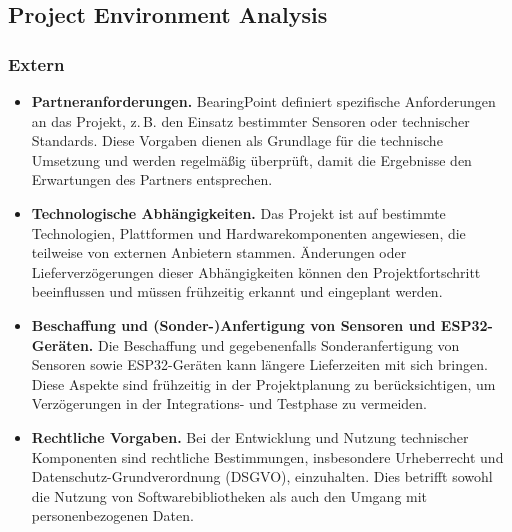 \documentclass{article}
\begin{document}
\subsection{Project Environment Analysis}

\subsubsection*{Extern}
\begin{itemize}
  \item \textbf{Partneranforderungen.} BearingPoint definiert spezifische Anforderungen an das Projekt, z.\,B. den Einsatz bestimmter Sensoren oder technischer Standards. Diese Vorgaben dienen als Grundlage für die technische Umsetzung und werden regelmäßig überprüft, damit die Ergebnisse den Erwartungen des Partners entsprechen.
  \item \textbf{Technologische Abhängigkeiten.} Das Projekt ist auf bestimmte Technologien, Plattformen und Hardwarekomponenten angewiesen, die teilweise von externen Anbietern stammen. Änderungen oder Lieferverzögerungen dieser Abhängigkeiten können den Projektfortschritt beeinflussen und müssen frühzeitig erkannt und eingeplant werden.
  \item \textbf{Beschaffung und (Sonder-)Anfertigung von Sensoren und ESP32-Geräten.} Die Beschaffung und gegebenenfalls Sonderanfertigung von Sensoren sowie ESP32-Geräten kann längere Lieferzeiten mit sich bringen. Diese Aspekte sind frühzeitig in der Projektplanung zu berücksichtigen, um Verzögerungen in der Integrations- und Testphase zu vermeiden.
  \item \textbf{Rechtliche Vorgaben.} Bei der Entwicklung und Nutzung technischer Komponenten sind rechtliche Bestimmungen, insbesondere Urheberrecht und Datenschutz-Grundverordnung (DSGVO), einzuhalten. Dies betrifft sowohl die Nutzung von Softwarebibliotheken als auch den Umgang mit personenbezogenen Daten.
\end{itemize}
\end{document}
